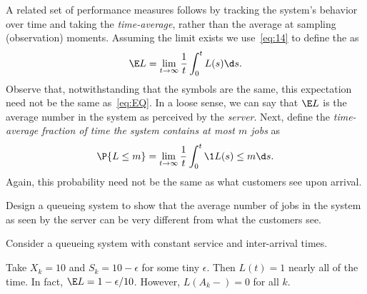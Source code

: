 A related set of performance measures follows by tracking the system's behavior over time and taking the \emph{time-average}, rather than the average at sampling (observation) moments.
Assuming the limit exists we use~\cref{eq:14} to define the  as
\begin{equation}
 \label{eq:46}
 \E L = \lim_{t\to\infty} \frac 1 t\int_0^t L(s) \d s.
\end{equation}
Observe that, notwithstanding that the symbols are the same, this expectation need not be the same as~\cref{eq:EQ}.
In a loose sense, we can say that $\E L$ is the average number in the system as perceived by the \emph{server}.
Next, define the \emph{time-average fraction of time the system contains at most $m$ jobs} as
\begin{equation}
 \label{eq:47}
 \P{L\leq m} =\lim_{t\to\infty} \frac 1 t\int_0^t \1{L(s)\leq m} \d s.
\end{equation}
Again, this probability need not be the same as what customers see upon arrival.


\begin{exercise}
Design a queueing system to show that the average number of jobs in the system as seen by the server can be very different from what the customers see.
\begin{hint}
Consider a queueing system with constant service and inter-arrival times.
\end{hint}
\begin{solution}
 Take $X_k = 10$ and $S_k = 10-\epsilon$ for some tiny
 $\epsilon$. Then $L(t) = 1$ nearly all of the time. In fact,
 $\E L = 1-\epsilon/10$. However, $L(A_k-)=0$ for all $k$.
\end{solution}
\end{exercise}



